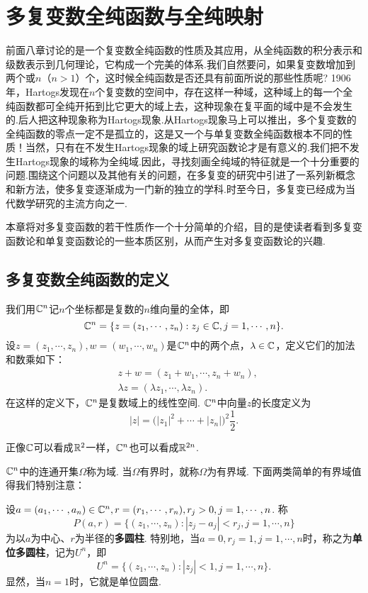 \setcounter{chapter}{8}
\chapter{多复变数全纯函数与全纯映射\label{chap9}}
前面八章讨论的是一个复变数全纯函数的性质及其应用，从全纯函数的积分表示和级数表示到几何理论，它构成一个完美的体系.我们自然要问，如果复变数增加到两个或$n$（$n>1$）个，这时候全纯函数是否还具有前面所说的那些性质呢? 1906年，Hartogs发现在$n$个复变数的空间中，存在这样一种域，这种域上的每一个全纯函数都可全纯开拓到比它更大的域上去，这种现象在复平面的域中是不会发生的.后人把这种现象称为Hartogs现象.从Hartogs现象马上可以推出，多个复变数的全纯函数的零点一定不是孤立的，这是又一个与单复变数全纯函数根本不同的性质！当然，只有在不发生Hartogs现象的域上研究函数论才是有意义的.我们把不发生Hartogs现象的域称为全纯域.因此，寻找刻画全纯域的特征就是一个十分重要的问题.围绕这个问题以及其他有关的问题，在多复变的研究中引进了一系列新概念和新方法，使多复变逐渐成为一门新的独立的学科.时至今日，多复变已经成为当代数学研究的主流方向之一.

本章将对多复变函数的若干性质作一个十分简单的介绍，目的是使读者看到多复变函数论和单复变函数论的一些本质区别，从而产生对多复变函数论的兴趣.

\section{多复变数全纯函数的定义\label{sec9.1}}
我们用$\mathbb C^n$记$n$个坐标都是复数的$n$维向量的全体，即
\[\mathbb C^n=\{z=(z_1,\cdots,z_n):z_j\in\mathbb C,j=1,\cdots,n\}.\]
设$z=(z_1,\cdots,z_n),w=(w_1,\cdots,w_n)$是$\mathbb C^n$中的两个点，$\lambda\in\mathbb C$，定义它们的加法和数乘如下：
\begin{align*}
&z+w=(z_1+w_1,\cdots,z_n+w_n),\\
&\lambda z=(\lambda z_1,\cdots,\lambda z_n).
\end{align*}
在这样的定义下，$\mathbb C^n$是复数域上的线性空间. $\mathbb C^n$中向量$z$的长度定义为
\[|z|=\big({|z_1|^2+\cdots+|z_n|\big)^2\frac12}.\]

正像$\mathbb C$可以看成$\mathbb R^2$一样，$\mathbb C^n$也可以看成$\mathbb R^{2n}$.

$\mathbb C^n$中的连通开集$\Omega$称为域. 当$\Omega$有界时，就称$\Omega$为有界域.
下面两类简单的有界域值得我们特别注意：

设$a=(a_1,\cdots,a_n)\in\mathbb C^n,r=(r_1,\cdots,r_n),r_j>0,j=1,\cdots,n$. 称
\[P(a,r)=\{(z_1,\cdots,z_n):|z_j-a_j|<r_j,j=1,\cdots,n\}\]
为以$a$为中心、$r$为半径的\textbf{多圆柱}. 特别地，当$a=0,r_j=1,j=1,\cdots,n$时，称之为\textbf{单位多圆柱}，记为$U^n$，即
\[U^n=\{(z_1,\cdots,z_n):|z_j|<1,j=1,\cdots,n\}.\]
显然，当$n=1$时，它就是单位圆盘.

